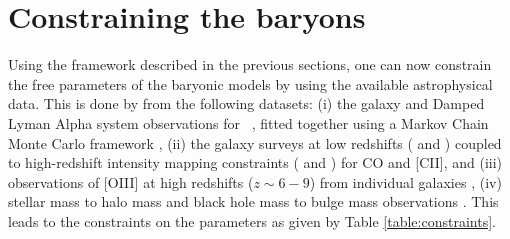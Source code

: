 
\section{Constraining the baryons}
\label{s:constraints}

Using the framework described in the previous sections, one can now constrain the free parameters of the baryonic models by using the available astrophysical data. This is done by from the following datasets: (i) the galaxy and Damped Lyman Alpha system observations for \HI\ \cite{hptrcar2015}, fitted together using a Markov Chain Monte Carlo framework \cite{hparaa2017}, (ii) the galaxy surveys at low redshifts (\cite{keres2003} and \cite{hemmati2017}) coupled to high-redshift intensity mapping constraints (\cite{pullen2018} and \cite{keating2016})  for CO and [CII], and (iii) observations of [OIII] at high redshifts ($z \sim 6-9$) from individual galaxies \cite{harikane2020}, (iv) stellar mass to halo mass \cite{behroozi2019} and black hole mass to bulge mass observations \cite{ferrarese2002, kormendy2013, wyithe2002}.
This leads to the constraints on the parameters as given by Table \ref{table:constraints}.



